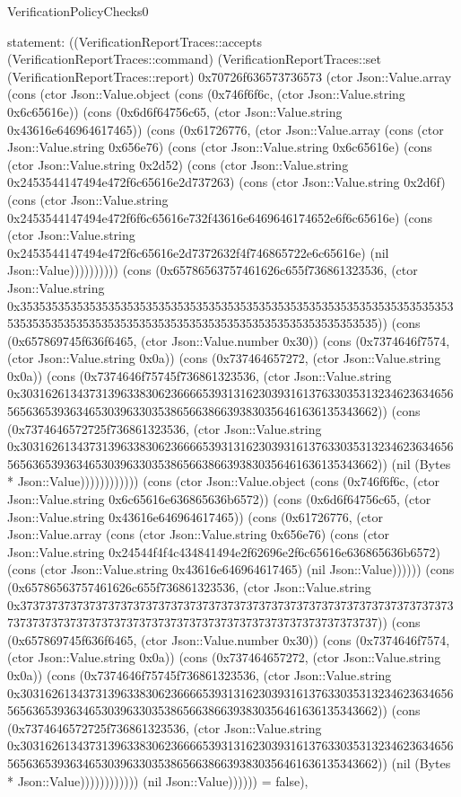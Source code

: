 \begin{lexlean}{VerificationPolicyChecks0}
\begin{semanticmodule}
{  statement: ((VerificationReportTraces::accepts (VerificationReportTraces::command) (VerificationReportTraces::set (VerificationReportTraces::report) 0x70726f636573736573 (ctor Json::Value.array (cons (ctor Json::Value.object (cons (0x746f6f6c, (ctor Json::Value.string 0x6c65616e)) (cons (0x6d6f64756c65, (ctor Json::Value.string 0x43616e646964617465)) (cons (0x61726776, (ctor Json::Value.array (cons (ctor Json::Value.string 0x656e76) (cons (ctor Json::Value.string 0x6c65616e) (cons (ctor Json::Value.string 0x2d52) (cons (ctor Json::Value.string 0x2453544147494e472f6c65616e2d737263) (cons (ctor Json::Value.string 0x2d6f) (cons (ctor Json::Value.string 0x2453544147494e472f6f6c65616e732f43616e6469646174652e6f6c65616e) (cons (ctor Json::Value.string 0x2453544147494e472f6c65616e2d7372632f4f746865722e6c65616e) (nil Json::Value)))))))))) (cons (0x65786563757461626c655f736861323536, (ctor Json::Value.string 0x35353535353535353535353535353535353535353535353535353535353535353535353535353535353535353535353535353535353535353535353535353535)) (cons (0x657869745f636f6465, (ctor Json::Value.number 0x30)) (cons (0x7374646f7574, (ctor Json::Value.string 0x0a)) (cons (0x737464657272, (ctor Json::Value.string 0x0a)) (cons (0x7374646f75745f736861323536, (ctor Json::Value.string 0x30316261343731396338306236666539313162303931613763303531323462363465656563653936346530396330353865663866393830356461636135343662)) (cons (0x7374646572725f736861323536, (ctor Json::Value.string 0x30316261343731396338306236666539313162303931613763303531323462363465656563653936346530396330353865663866393830356461636135343662)) (nil (Bytes * Json::Value)))))))))))) (cons (ctor Json::Value.object (cons (0x746f6f6c, (ctor Json::Value.string 0x6c65616e636865636b6572)) (cons (0x6d6f64756c65, (ctor Json::Value.string 0x43616e646964617465)) (cons (0x61726776, (ctor Json::Value.array (cons (ctor Json::Value.string 0x656e76) (cons (ctor Json::Value.string 0x24544f4f4c434841494e2f62696e2f6c65616e636865636b6572) (cons (ctor Json::Value.string 0x43616e646964617465) (nil Json::Value)))))) (cons (0x65786563757461626c655f736861323536, (ctor Json::Value.string 0x37373737373737373737373737373737373737373737373737373737373737373737373737373737373737373737373737373737373737373737373737373737)) (cons (0x657869745f636f6465, (ctor Json::Value.number 0x30)) (cons (0x7374646f7574, (ctor Json::Value.string 0x0a)) (cons (0x737464657272, (ctor Json::Value.string 0x0a)) (cons (0x7374646f75745f736861323536, (ctor Json::Value.string 0x30316261343731396338306236666539313162303931613763303531323462363465656563653936346530396330353865663866393830356461636135343662)) (cons (0x7374646572725f736861323536, (ctor Json::Value.string 0x30316261343731396338306236666539313162303931613763303531323462363465656563653936346530396330353865663866393830356461636135343662)) (nil (Bytes * Json::Value)))))))))))) (nil Json::Value)))))) = false),
}
\end{semanticmodule}
\end{lexlean}
